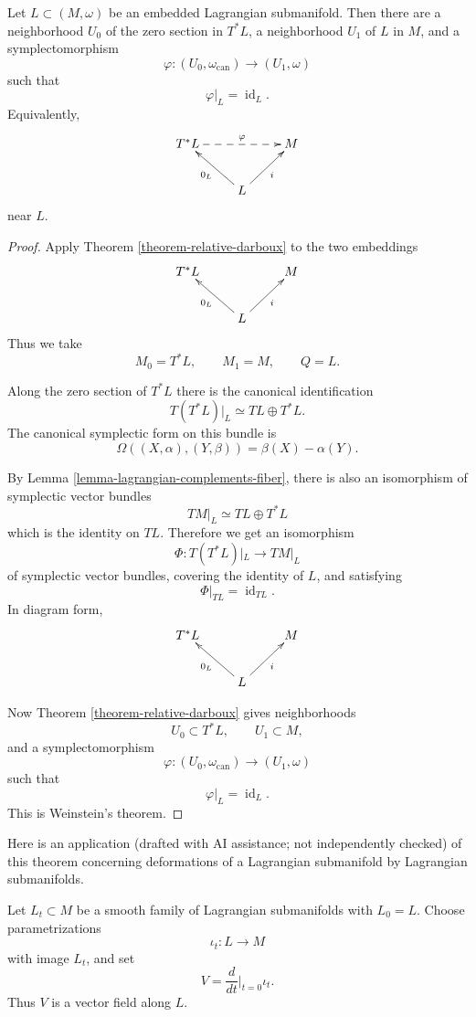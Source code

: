 \begin{theorem}
\label{theorem-weinstein-lagrangian}
Let $L\subset (M,\omega)$ be an embedded
Lagrangian submanifold. Then there are a
neighborhood $U_0$ of the zero section in
$T^*L$, a neighborhood $U_1$ of $L$ in
$M$, and a symplectomorphism
$$
\varphi:(U_0,\omega_{\operatorname{can}})
\longrightarrow (U_1,\omega)
$$
such that
$$
\varphi|_L=\operatorname{id}_L.
$$
Equivalently,
$$
\xymatrix{
T^*L \ar@{-->}[rr]^-{\varphi}
&& M\\
& L \ar[ul]^{0_L} \ar[ur]_{i} &
}
$$
near $L$.
\end{theorem}

\begin{proof}
Apply Theorem
\ref{theorem-relative-darboux} to the two
embeddings
$$
\xymatrix{
T^*L && M\\
& L \ar[ul]^{0_L} \ar[ur]_{i} &
}
$$
Thus we take
$$
M_0=T^*L,
\qquad
M_1=M,
\qquad
Q=L.
$$

\medskip\noindent
Along the zero section of $T^*L$ there is
the canonical identification
$$
T(T^*L)|_L\simeq TL\oplus T^*L.
$$
The canonical symplectic form on this
bundle is
$$
\Omega((X,\alpha),(Y,\beta))
=
\beta(X)-\alpha(Y).
$$

\medskip\noindent
By Lemma
\ref{lemma-lagrangian-complements-fiber},
there is also an isomorphism of symplectic
vector bundles
$$
TM|_L\simeq TL\oplus T^*L
$$
which is the identity on $TL$. Therefore
we get an isomorphism
$$
\Phi:T(T^*L)|_L\longrightarrow TM|_L
$$
of symplectic vector bundles, covering the
identity of $L$, and satisfying
$$
\Phi|_{TL}=\operatorname{id}_{TL}.
$$
In diagram form,
$$
\xymatrix{
T^*L && M\\
& L \ar[ul]^{0_L} \ar[ur]_{i} &
}
$$

\medskip\noindent
Now Theorem
\ref{theorem-relative-darboux} gives
neighborhoods
$$
U_0\subset T^*L,
\qquad
U_1\subset M,
$$
and a symplectomorphism
$$
\varphi:(U_0,\omega_{\operatorname{can}})
\longrightarrow (U_1,\omega)
$$
such that
$$
\varphi|_L=\operatorname{id}_L.
$$
This is Weinstein's theorem.
\end{proof}

\medskip\noindent
Here is an application
(drafted with AI assistance; not independently checked)
of this theorem concerning deformations
of a Lagrangian submanifold 
by Lagrangian submanifolds.

Let $L_t\subset M$ be a smooth family of
Lagrangian submanifolds with $L_0=L$.
Choose parametrizations
$$
\iota_t:L\to M
$$
with image $L_t$, and set
$$
V=
\frac{d}{dt}\bigg|_{t=0}\iota_t .
$$
Thus $V$ is a vector field along $L$.

